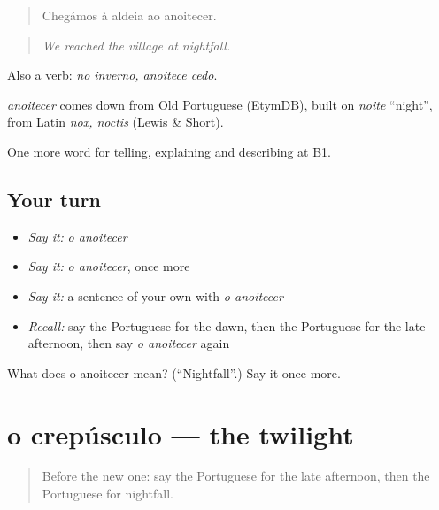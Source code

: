 \begin{quote}
Chegámos à aldeia ao anoitecer.
\end{quote}

\begin{quote}
\emph{We reached the village at nightfall.}
\end{quote}

Also a verb: \emph{no inverno, anoitece cedo}.

\begin{cousinweb}
\emph{anoitecer} comes down from Old Portuguese (EtymDB), built on \emph{noite} \textquotedblleft{}night\textquotedblright{}, from Latin \emph{nox, noctis} (Lewis \& Short).
\end{cousinweb}

\begin{grammarlens}[title={What you've built}]
One more word for telling, explaining and describing at B1.
\end{grammarlens}

\subsection*{Your turn}
\begin{itemize}
\raggedright
  \item \emph{Say it:} \emph{o anoitecer}
  \item \emph{Say it:} \emph{o anoitecer}, once more
  \item \emph{Say it:} a sentence of your own with \emph{o anoitecer}
  \item \emph{Recall:} say the Portuguese for the dawn, then the Portuguese for the late afternoon, then say \emph{o anoitecer} again
\end{itemize}

\begin{tcolorbox}[breakable,colback=teal!4,colframe=teal!35!black,title={Before you move on}]
What does o anoitecer mean? (\textquotedblleft{}Nightfall\textquotedblright{}.) Say it once more.
\end{tcolorbox}
\section[o crepúsculo]{o crepúsculo — the twilight}

\label{lesson:PT-C275-crepusculo}



\begin{quote}
Before the new one: say the Portuguese for the late afternoon, then the Portuguese for nightfall.
\end{quote}

